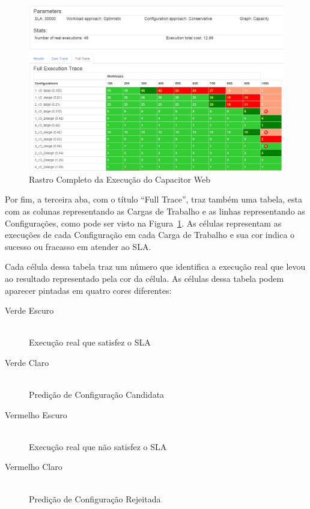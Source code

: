 \begin{figure}[htb]
  \caption{\label{fig:capacitor_web_fulltrace}Rastro Completo da Execução do Capacitor Web}
  \begin{center}
    \includegraphics[scale=0.5]{img/CapacitorWeb_FullTrace}
  \end{center}
\end{figure}

Por fim, a terceira aba, com o título ``Full Trace'', traz também uma tabela, 
esta com as colunas representando as Cargas de Trabalho e as linhas representando
as Configurações, como pode ser visto na Figura~\ref{fig:capacitor_web_fulltrace}. 
As células representam as execuções de cada Configuração em cada Carga de Trabalho 
e sua cor indica o sucesso ou fracasso em atender ao SLA.

Cada célula dessa tabela traz um número que identifica a execução real que levou
ao resultado representado pela cor da célula. As células dessa tabela podem aparecer
pintadas em quatro cores diferentes:

\begin{description}
  \item[Verde Escuro] \hfill \\ Execução real que satisfez o SLA
  \item[Verde Claro] \hfill \\ Predição de Configuração Candidata
  \item[Vermelho Escuro] \hfill \\ Execução real que não satisfez o SLA
  \item[Vermelho Claro] \hfill \\ Predição de Configuração Rejeitada
\end{description}

